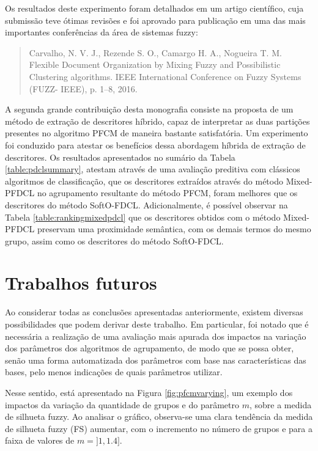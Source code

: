 Os resultados deste experimento foram detalhados em um artigo científico, cuja submissão teve ótimas revisões e foi aprovado para publicação em uma das mais importantes conferências da área de sistemas fuzzy:

\begin{quote}
Carvalho, N. V. J., Rezende S. O., Camargo H. A., Nogueira T. M. Flexible Document Organization by Mixing Fuzzy and Possibilistic Clustering algorithms. IEEE International Conference on Fuzzy Systems (FUZZ- IEEE), p. 1–8, 2016.
\end{quote}

A segunda grande contribuição desta monografia consiste na proposta de um método de extração de
descritores híbrido, capaz de interpretar as duas partições presentes no algoritmo PFCM de maneira
bastante satisfatória. Um experimento foi conduzido para atestar os
benefícios dessa abordagem híbrida de extração de descritores. Os resultados apresentados no sumário
da Tabela \ref{table:pdclsummary}, atestam através de uma avaliação preditiva com clássicos
algoritmos de classificação, que os descritores extraídos através do método Mixed-PFDCL no
agrupamento resultante do método PFCM, foram melhores que os descritores do método SoftO-FDCL.
Adicionalmente, é possível observar na Tabela \ref{table:rankingmixedpdcl} que os descritores obtidos com o método
Mixed-PFDCL preservam uma proximidade semântica, com os demais termos do mesmo grupo, assim como os
descritores do método SoftO-FDCL.

\section{Trabalhos futuros}

Ao considerar todas as conclusões apresentadas anteriormente, existem diversas possibilidades que
podem derivar deste trabalho. Em particular, foi notado que é necessária a realização de uma avaliação
mais apurada dos impactos na variação dos parâmetros dos algoritmos de agrupamento, de modo que se
possa obter, senão uma forma automatizada dos parâmetros com base nas características das bases,
pelo menos indicações de quais parâmetros utilizar. 

Nesse sentido, está apresentado na Figura \ref{fig:pfcmvarying}, um exemplo dos impactos da variação
da quantidade de grupos e do parâmetro $m$, sobre a medida de silhueta fuzzy. Ao analisar o gráfico,
observa-se uma clara tendência da medida de silhueta fuzzy (FS) aumentar, com o incremento no número
de grupos e para a faixa de valores de $m=]1,1.4]$. 

